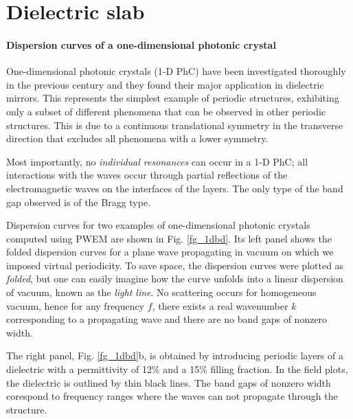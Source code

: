 \label{chapter_results}
\section{Dielectric slab} \label{section_Dielectric slab}%
\paragraph{Dispersion curves of a one-dimensional photonic crystal}%
One-dimensional photonic crystals (1-D PhC) have been investigated thoroughly in the previous century and they found their major application in dielectric mirrors. This represents the simplest example of periodic structures, exhibiting only a subset of different phenomena that can be observed in other periodic structures. This is due to a continuous translational symmetry in the transverse direction that excludes all phenomena with a lower symmetry. 

Most importantly, no \textit{individual resonances} can occur in a 1-D PhC; all interactions with the waves occur through partial reflections of the electromagnetic waves on the interfaces of the layers. The only type of the band gap observed is of the Bragg type.

Dispersion curves for two examples of one-dimensional photonic crystals computed using PWEM are shown in Fig. \ref{fg_1dbd}. 
Its left panel shows the folded dispersion curves for a plane wave propagating in vacuum on which we imposed virtual periodicity. To save space, the dispersion curves were plotted as \textit{folded}, but one can easily imagine how the curve unfolds into a linear dispersion of vacuum, known as the \textit{light line}. No scattering occurs for homogeneous vacuum, hence for any frequency $f$, there exists a real wavenumber $k$ corresponding to a propagating wave and there are no band gaps of nonzero width. 

The right panel, Fig. \ref{fg_1dbd}b, is obtained by introducing periodic layers of a dielectric with a permittivity of 12\% and a 15\% filling fraction. In the field plots, the dielectric is outlined by thin black lines. The band gaps of nonzero width corespond to frequency ranges where the waves can not propagate through the structure. %

